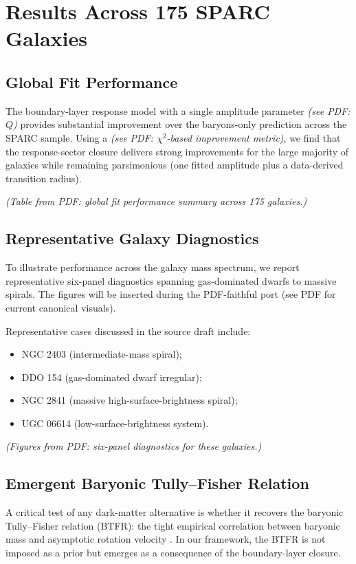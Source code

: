 \section{Results Across 175 SPARC Galaxies}


\subsection{Global Fit Performance}
The boundary-layer response model with a single amplitude parameter \emph{(see PDF: $Q$)} provides substantial improvement over the baryons-only prediction across the SPARC sample. Using a \emph{(see PDF: $\chi^2$-based improvement metric)}, we find that the response-sector closure delivers strong improvements for the large majority of galaxies while remaining parsimonious (one fitted amplitude plus a data-derived transition radius).

\emph{(Table from PDF: global fit performance summary across 175 galaxies.)}

\subsection{Representative Galaxy Diagnostics}
To illustrate performance across the galaxy mass spectrum, we report representative six-panel diagnostics spanning gas-dominated dwarfs to massive spirals. The figures will be inserted during the PDF-faithful port (see PDF for current canonical visuals).

Representative cases discussed in the source draft include:
\begin{itemize}
\item NGC 2403 (intermediate-mass spiral);
\item DDO 154 (gas-dominated dwarf irregular);
\item NGC 2841 (massive high-surface-brightness spiral);
\item UGC 06614 (low-surface-brightness system).
\end{itemize}

\emph{(Figures from PDF: six-panel diagnostics for these galaxies.)}

\subsection{Emergent Baryonic Tully–Fisher Relation}
A critical test of any dark-matter alternative is whether it recovers the baryonic Tully--Fisher relation (BTFR): the tight empirical correlation between baryonic mass and asymptotic rotation velocity \citep{McGaugh2000}. In our framework, the BTFR is not imposed as a prior but emerges as a consequence of the boundary-layer closure.


